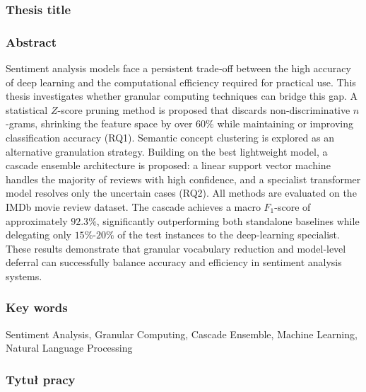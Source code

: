\documentclass[a4paper,twoside,12pt]{book}
\newcommand{\zscore}{Z}
\begin{document}
\cleardoublepage

\rmfamily\normalfont
\pagestyle{empty}



\subsubsection*{Thesis title}  
\Title

\subsubsection*{Abstract} 

Sentiment analysis models face a persistent trade‑off between the high accuracy of deep learning and the computational efficiency required for practical use.
This thesis investigates whether granular computing techniques can bridge this gap.
A statistical $\zscore$-score pruning method is proposed that discards non‑discriminative $n$-grams, shrinking the feature space by over $60\%$ while maintaining or improving classification accuracy (RQ1). Semantic concept clustering is explored as an alternative granulation strategy. Building on the best lightweight model, a cascade ensemble architecture is proposed: a linear support vector machine handles the majority of reviews with high confidence, and a specialist transformer model resolves only the uncertain cases (RQ2). All methods are evaluated on the IMDb movie review dataset. The cascade achieves a macro $F_{1}$-score of approximately $92.3\%$, significantly outperforming both standalone baselines while delegating only $15\%$-$20\%$ of the test instances to the deep-learning specialist. These results demonstrate that granular vocabulary reduction and model‑level deferral can successfully balance accuracy and efficiency in sentiment analysis systems.

\subsubsection*{Key words}
Sentiment Analysis, Granular Computing, Cascade Ensemble, Machine Learning, Natural Language Processing

\clearpage
\subsubsection*{Tytuł pracy}
\begin{otherlanguage}{polish}
\TitleAlt
\end{otherlanguage}
\end{document}
